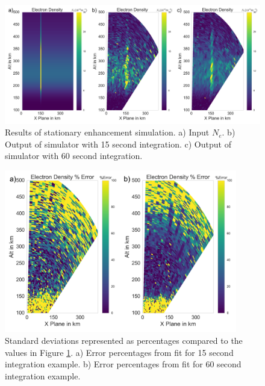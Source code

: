 \documentclass[draft,ras]{agutex}
\begin{document}
\begin{article}
\begin{figure}[!t]
\centering
\includegraphics[width=6in]{stationary}
\caption{Results of stationary enhancement simulation. a) Input $N_e$. b) Output of simulator with 15 second integration. c) Output of simulator with 60 second integration.}
\label{fig:stationaryall}
\end{figure}

\begin{figure}[!t]
\centering
\includegraphics[width=4in]{Errorstationary}
\caption{Standard deviations represented as percentages compared to the values in Figure \ref{fig:stationaryall}. a)  Error percentages from fit for 15 second integration example. b) Error percentages from fit for 60 second integration example.}
\label{fig:errorstationaryall}
\end{figure}


\end{article}
\end{document}

